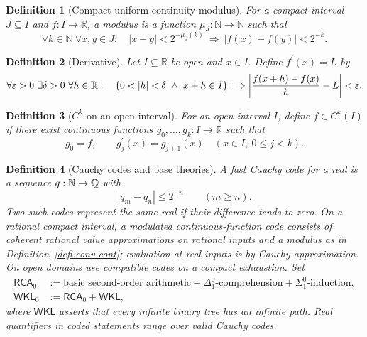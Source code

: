 \documentclass[11pt,reqno]{amsart}
\theoremstyle{redplain}
\newtheorem{definition}{Definition}[section]
\numberwithin{equation}{section}
\begin{document}
\begin{definition}[Compact-uniform continuity modulus]
For a compact interval $J\subseteq I$ and $f:I\rightarrow \mathbb{R}$, a
modulus is a function $\mu _{J}:\mathbb{N}\rightarrow \mathbb{N}$ such that 
\begin{equation}
\forall k\in \mathbb{N}\ \forall x,y\in J:\quad |x-y|<2^{-\mu _{J}(k)}\
\Longrightarrow \ |f(x)-f(y)|<2^{-k}.
\end{equation}
\end{definition}

\begin{definition}[Derivative]
Let $I\subseteq \mathbb{R}$ be open and $x\in I$. Define $f^{\prime }(x)=L$
by 
\begin{equation}
\forall \varepsilon >0\ \exists \delta >0\ \forall h\in \mathbb{R}:\quad 
\bigl(0<|h|<\delta \ \wedge \ x+h\in I\bigr)\Longrightarrow \left\vert \frac{%
f(x+h)-f(x)}{h}-L\right\vert <\varepsilon .
\end{equation}
\end{definition}

\begin{definition}[$C^{k}$ on an open interval]
For an open interval $I$, define $f\in C^{k}(I)$ if there exist continuous
functions $g_{0},\ldots ,g_{k}:I\rightarrow \mathbb{R}$ such that 
\begin{equation}
g_{0}=f,\qquad g_{j}^{\prime }(x)=g_{j+1}(x)\quad (x\in I,\ 0\leq j<k).
\end{equation}
\end{definition}

\begin{definition}[Cauchy codes and base theories]
A fast Cauchy code for a real is a sequence $q:\mathbb{N}\rightarrow \mathbb{%
Q}$ with 
\begin{equation}
|q_{m}-q_{n}|\leq 2^{-n}\qquad (m\geq n).
\end{equation}%
Two such codes represent the same real if their difference tends to zero. On
a rational compact interval, a modulated continuous-function code consists
of coherent rational value approximations on rational inputs and a modulus
as in Definition~\ref{defi:conv-cont}; evaluation at real inputs is by
Cauchy approximation. On open domains use compatible codes on a compact
exhaustion. Set 
\begin{equation*}
\begin{aligned} \mathsf{RCA}_0&:=\text{basic second-order arithmetic}
+\Delta^0_1\text{-comprehension}+\Sigma^0_1\text{-induction},\\
\mathsf{WKL}_0&:=\mathsf{RCA}_0+\mathsf{WKL}, \end{aligned}
\end{equation*}%
where $\mathsf{WKL}$ asserts that every infinite binary tree has an infinite
path. Real quantifiers in coded statements range over valid Cauchy codes.
\end{definition}
\end{document}
